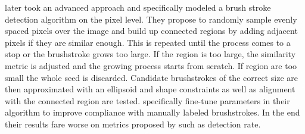 \citeauthor*{lamberti} later took an advanced approach and specifically modeled a brush stroke detection algorithm on the pixel level.
They propose to randomly sample evenly spaced pixels over the image and build up connected regions by adding adjacent pixels if they are similar enough.
This is repeated until the process comes to a stop or the brushstroke grows too large.
If the region is too large, the similarity metric is adjusted and the growing process starts from scratch.
If region are too small the whole seed is discarded.
Candidate brushstrokes of the correct size are then approximated with an ellipsoid and shape constraints as well as alignment with the connected region are tested.
\citeauthor*{lamberti} specifically fine-tune parameters in their algorithm to improve compliance with manually labeled brushstrokes.
In the end their results fare worse on metrics proposed by \citeauthor{rhythmic} such as detection rate.

